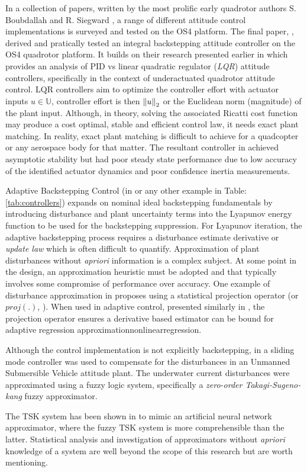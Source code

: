 \par
\vspace{-15pt}
In a collection of papers, written by the most prolific early quadrotor authors S. Boubdallah and R. Siegward \cite{pidlqr,indoorslidingmode, fullquadcoptercontrol}, a range of different attitude control implementations is surveyed and tested on the OS4 platform. The final paper, \cite{fullquadcoptercontrol}, derived and pratically tested an integral backstepping attitude controller on the OS4 quadrotor platform. It builds on their research presented earlier in \cite{pidlqr} which provides an analysis of PID vs linear quadratic regulator (\emph{LQR}) attitude controllers, specifically in the context of underactuated quadrotor attitude control. LQR controllers aim to optimize the controller effort with actuator inputs $u\in\mathbb{U}$, controller effort is then $\left\lVert u\right\rVert_2$ or the Euclidean norm (magnitude) of the plant input. Although, in theory, solving the associated Ricatti cost function may produce a cost optimal, stable and efficient control law, it needs exact plant matching. In reality, exact plant matching is difficult to achieve for a quadcopter or any aerospace body for that matter. The resultant controller in \cite{pidlqr} achieved asymptotic stability but had poor steady state performance due to low accuracy of the identified actuator dynamics and poor confidence inertia measurements.
\par
Adaptive Backstepping Control (in \cite{backstepping} or any other example in Table:\ref{tab:controllers}) expands on nominal ideal backstepping fundamentals by introducing disturbance and plant uncertainty terms into the Lyapunov energy function to be used for the backstepping suppression. For Lyapunov iteration, the adaptive backstepping process requires a disturbance estimate derivative or \emph{update law} which is often difficult to quantify. Approximation of plant disturbances without \emph{apriori} information is a complex subject. At some point in the design, an approximation heuristic must be adopted and that typically involves some compromise of performance over accuracy. One example of disturbance approximation in \cite{nonlinearadaptive} proposes using a statistical projection operator (or $proj(.)$, \cite{adaptiveregulation}). When used in adaptive control, presented similarly in \cite{outputfeedback}, the projection operator ensures a derivative based estimator can be bound for adaptive regression approximation{nonlinearregression}.
\par
Although the control implementation is not explicitly backstepping, in \cite{adaptiveslidingmode} a sliding mode controller was used to compensate for the disturbances in an Unmanned Submersible Vehicle attitude plant. The underwater current disturbances were approximated using a fuzzy logic system, specifically a \emph{zero-order Takagi-Sugeno-kang} fuzzy approximator. 
\par
The TSK system has been shown in \cite{zeroTSK} to mimic an artificial neural network approximator, where the fuzzy TSK system is more comprehensible than the latter. Statistical analysis and investigation of approximators without \emph{apriori} knowledge of a system are well beyond the scope of this research but are worth mentioning.
